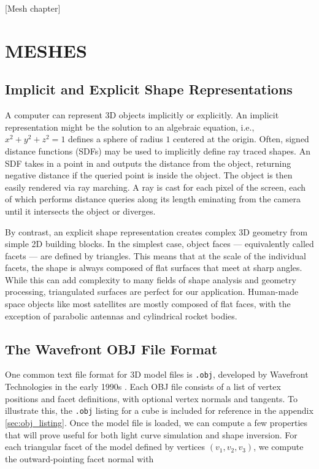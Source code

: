 [Mesh chapter]

\chapter{MESHES}

\section{Implicit and Explicit Shape Representations}

A computer can represent 3D objects implicitly or explicitly. An implicit representation might be the solution to an algebraic equation, i.e., $x^2 + y^2 + z^2 = 1$ defines a sphere of radius $1$ centered at the origin. Often, signed distance functions (SDFs) may be used to implicitly define ray traced shapes. An SDF takes in a point in \rthree and outputs the distance from the object, returning negative distance if the queried point is inside the object. The object is then easily rendered via ray marching. A ray is cast for each pixel of the screen, each of which performs distance queries along its length eminating from the camera until it intersects the object or diverges. 

By contrast, an explicit shape representation creates complex 3D geometry from simple 2D building blocks. In the simplest case, object faces --- equivalently called facets --- are defined by triangles. This means that at the scale of the individual facets, the shape is always composed of flat surfaces that meet at sharp angles. While this can add complexity to many fields of shape analysis and geometry processing, triangulated surfaces are perfect for our application. Human-made space objects like most satellites are mostly composed of flat faces, with the exception of parabolic antennas and cylindrical rocket bodies.

\section{The Wavefront OBJ File Format}

One common text file format for 3D model files is \texttt{.obj}, developed by Wavefront Technologies in the early 1990s \cite{obj_format}. Each OBJ file consists of a list of vertex positions and facet definitions, with optional vertex normals and tangents. To illustrate this, the \texttt{.obj} listing for a cube is included for reference in the appendix \ref{sec:obj_listing}. Once the model file is loaded, we can compute a few properties that will prove useful for both light curve simulation and shape inversion. For each triangular facet of the model defined by vertices $\left(v_1, v_2, v_3\right)$, we compute the outward-pointing facet normal with

